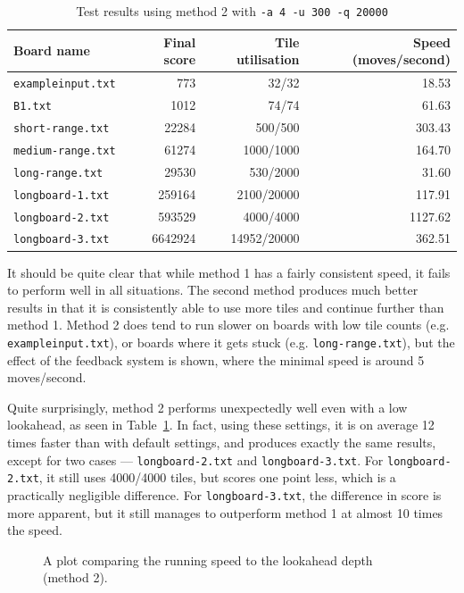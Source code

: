 \documentclass[a4paper, 11pt, titlepage]{report}
\begin{document}
\begin{table}[H]
  \centering
  \caption{Test results using method 2 with \texttt{-a 4 -u 300 -q 20000}}
    \begin{tabular}{lrrr}
    \hline
    Board name & Final score & Tile utilisation & Speed (moves/second) \\
    \hline
    \texttt{exampleinput.txt} &   773    &   32/32    & 18.53  \\
    \texttt{B1.txt} &   1012    &  74/74     &  61.63 \\
    \texttt{short-range.txt} & 22284 & 500/500 & 303.43 \\
    \texttt{medium-range.txt} & 61274 & 1000/1000 & 164.70 \\
    \texttt{long-range.txt} & 29530 & 530/2000 & 31.60 \\
    \texttt{longboard-1.txt} & 259164 & 2100/20000 & 117.91 \\
    \texttt{longboard-2.txt} & 593529 & 4000/4000 & 1127.62 \\
    \texttt{longboard-3.txt} & 6642924 & 14952/20000 & 362.51 \\
    \hline
    \end{tabular}%
  \label{tab:results-method2-modded}%
\end{table}%

It should be quite clear that while method 1 has a fairly consistent speed, it fails to perform well in all situations. The second method produces much better results in that it is consistently able to use more tiles and continue further than method 1. Method 2 does tend to run slower on boards with low tile counts (e.g. \texttt{exampleinput.txt}), or boards where it gets stuck (e.g. \texttt{long-range.txt}), but the effect of the feedback system is shown, where the minimal speed is around 5 moves/second.

Quite surprisingly, method 2 performs unexpectedly well even with a low lookahead, as seen in Table~\ref{tab:results-method2-modded}. In fact, using these settings, it is on average 12 times faster than with default settings, and produces exactly the same results, except for two cases --- \texttt{longboard-2.txt} and \texttt{longboard-3.txt}. For \texttt{longboard-2.txt}, it still uses 4000/4000 tiles, but scores one point less, which is a practically negligible difference. For \texttt{longboard-3.txt}, the difference in score is more apparent, but it still manages to outperform method 1 at almost 10 times the speed.

\begin{figure}[H]
	\centering
	\caption{A plot comparing the running speed to the lookahead depth (method 2).}
	\label{fig:lookahead_speed}
\end{figure}
\end{document}
